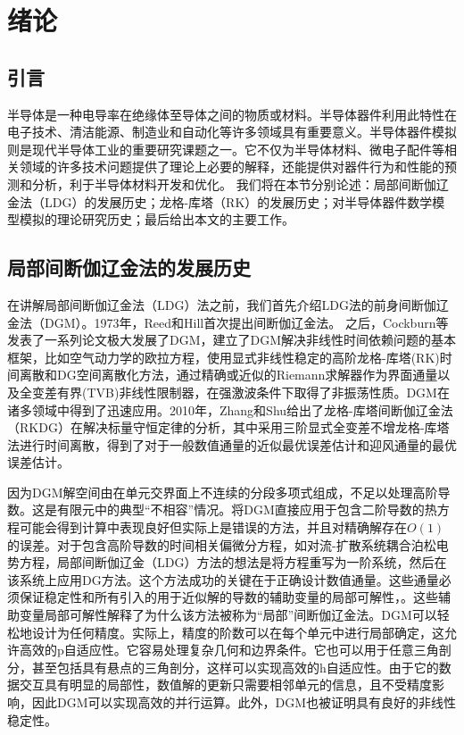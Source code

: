 \cleardoublepage

\section{绪论}

\subsection{引言}
半导体是一种电导率在绝缘体至导体之间的物质或材料。半导体器件利用此特性在电子技术、清洁能源、制造业和自动化等许多领域具有重要意义。半导体器件模拟则是现代半导体工业的重要研究课题之一。它不仅为半导体材料、微电子配件等相关领域的许多技术问题提供了理论上必要的解释，还能提供对器件行为和性能的预测和分析，利于半导体材料开发和优化。
我们将在本节分别论述：局部间断伽辽金法（LDG）的发展历史；龙格-库塔（RK）的发展历史；对半导体器件数学模型模拟的理论研究历史；最后给出本文的主要工作。
\subsection{局部间断伽辽金法的发展历史}
在讲解局部间断伽辽金法（LDG）法之前，我们首先介绍LDG法的前身间断伽辽金法（DGM）。1973年，Reed和Hill首次提出间断伽辽金法\cite{reed1973triangular}。
之后，Cockburn等发表了一系列论文极大发展了DGM，建立了DGM解决非线性时间依赖问题的基本框架\cite{reed1973triangular,cockburn1991runge,cockburn1989tvb2,cockburn1989tvb3,cockburn1990runge,cockburn1998runge}，比如空气动力学的欧拉方程，使用显式非线性稳定的高阶龙格-库塔(RK)时间离散和DG空间离散化方法，通过精确或近似的Riemann求解器作为界面通量以及全变差有界(TVB)非线性限制器，在强激波条件下取得了非振荡性质。DGM在诸多领域中得到了迅速应用\cite{cockburn2000development}。2010年，Zhang和Shu给出了龙格-库塔间断伽辽金法（RKDG）在解决标量守恒定律的分析，其中采用三阶显式全变差不增龙格-库塔法进行时间离散，得到了对于一般数值通量的近似最优误差估计和迎风通量的最优误差估计\cite{zhang2010stabilitya}。

因为DGM解空间由在单元交界面上不连续的分段多项式组成，不足以处理高阶导数。这是有限元中的典型“不相容”情况。将DGM直接应用于包含二阶导数的热方程可能会得到计算中表现良好但实际上是错误的方法，并且对精确解存在$O(1)$的误差\cite{cockburn2001runge,zhang2003analysis}。对于包含高阶导数的时间相关偏微分方程，如对流-扩散系统耦合泊松电势方程，局部间断伽辽金（LDG）方法的想法是将方程重写为一阶系统，然后在该系统上应用DG方法。这个方法成功的关键在于正确设计数值通量。这些通量必须保证稳定性和所有引入的用于近似解的导数的辅助变量的局部可解性，。这些辅助变量局部可解性解释了为什么该方法被称为“局部”间断伽辽金法\cite{cockburn1998local}。DGM可以轻松地设计为任何精度。实际上，精度的阶数可以在每个单元中进行局部确定，这允许高效的p自适应性。它容易处理复杂几何和边界条件。它也可以用于任意三角剖分，甚至包括具有悬点的三角剖分，这样可以实现高效的h自适应性。由于它的数据交互具有明显的局部性，数值解的更新只需要相邻单元的信息，且不受精度影响，因此DGM可以实现高效的并行运算。此外，DGM也被证明具有良好的非线性稳定性。

